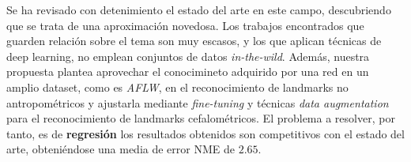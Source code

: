 \medskip

\noindent Se ha revisado con detenimiento el estado del arte en este campo, descubriendo que se trata de una aproximación novedosa. Los trabajos encontrados que guarden relación sobre el tema son muy escasos, y los que aplican técnicas de deep learning, no emplean conjuntos de datos \textit{in-the-wild}. Además, nuestra propuesta plantea aprovechar el conocimineto adquirido por una red en un amplio dataset, como es \textit{AFLW}, en el reconocimiento de landmarks no antropométricos y ajustarla mediante \textit{fine-tuning}  y técnicas \textit{data augmentation}  para el reconocimiento de landmarks cefalométricos. El problema a resolver, por tanto, es de \textbf{regresión} los resultados obtenidos son competitivos con el estado del arte, obteniéndose una media de error NME de $2.65$.

\endinput
